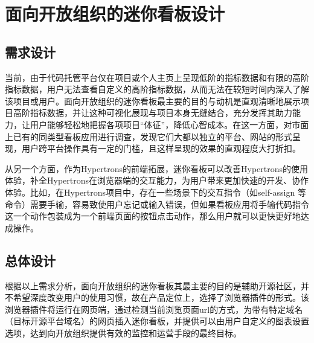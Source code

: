 \section{面向开放组织的迷你看板设计}
\subsection{需求设计}
\par 当前，由于代码托管平台仅在项目或个人主页上呈现低阶的指标数据和有限的高阶指标数据，用户无法查看自定义的高阶指标数据，从而无法在较短时间内深入了解该项目或用户。面向开放组织的迷你看板最主要的目的与动机是直观清晰地展示项目高阶指标数据，并让这种可视化展现与项目本身无缝结合，充分发挥其助力能力，让用户能够轻松地把握各项项目“体征”，降低心智成本。在这一方面，对市面上已有的同类型看板应用进行调查，发现它们大都以独立的平台、网站的形式呈现，用户跨平台操作具有一定的门槛，且这样呈现的效果的直观程度大打折扣。

\par 从另一个方面，作为Hypertrons的前端拓展，迷你看板可以改善Hypertrons的使用体验，补全Hypertrons在浏览器端的交互能力，为用户带来更加快速的开发、协作体验。比如，在Hypertrons项目中，存在一些场景下的交互指令（如self-assign 等命令）需要手输，容易致使用户忘记或输入错误，但如果看板应用将手输代码指令这一个动作包装成为一个前端页面的按钮点击动作，那么用户就可以更快更好地达成操作。%

\subsection{总体设计}
\par 根据以上需求分析，面向开放组织的迷你看板其最主要的目的是辅助开源社区，并不希望深度改变用户的使用习惯，故在产品定位上，选择了浏览器插件的形式。该浏览器插件将运行在网页端，通过检测当前浏览页面url的方式，为带有特定域名（目标开源平台域名）的网页插入迷你看板，并提供可以由用户自定义的图表设置选项，达到向开放组织提供有效的监控和运营手段的最终目标。


